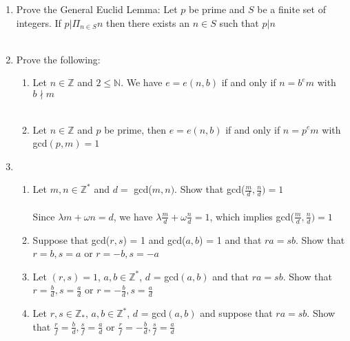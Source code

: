 \documentclass[11pt]{article}
\begin{document}
\begin{enumerate}
\begin{enumerate}
\end{enumerate}

\newpage %
\item Prove the General Euclid Lemma: Let $p$ be prime and $S$ be a finite set of integers.  If $p|\Pi_{n \in S}n$ then there exists an $n \in S$ such that $p | n$
\\
\\


\newpage %
\item Prove the following:
\begin{enumerate}
\item Let $n \in \mathbb{Z}$ and $2 \leq \mathbb{N}$.  We have $e = e(n,b)$ if and only if $n = b^em$ with $b \nmid m$\\
\\
\item Let $n \in \mathbb{Z}$ and $p$ be prime, then $e = e(n,b)$ if and only if $n = p^em$ with gcd$(p,m) = 1$
\end{enumerate}


\newpage %
\item 
\begin{enumerate}
\item Let $m,n \in \mathbb{Z}^*$ and $d = $ gcd($m,n)$.  Show that gcd($\tfrac{m}{d} , \tfrac{n}{d}) = 1$
\\\\
Since $\lambda m + \omega n = d$, we have $\lambda \tfrac{m}{d} + \omega \tfrac{n}{d} = 1$, which implies gcd($\tfrac{m}{d} , \tfrac{n}{d}) = 1$
\\
\item Suppose that gcd($r,s$) = 1 and gcd($a,b$) = 1 and that $ra = sb$.  Show that $r=b, s = a$ or $r = -b, s = -a$
\\
\item Let $(r,s) = 1$, $a,b \in \mathbb{Z}^*$, $d$ = gcd$(a,b)$ and that $ra = sb$.  Show that $r = \tfrac{b}{d}, s = \tfrac{a}{d}$ or $r = -\tfrac{b}{d}, s=\tfrac{a}{d}$
\\
\item Let $r,s \in \mathbb{Z}_*$, $a,b \in \mathbb{Z}^*$, $d$ = gcd$(a,b)$ and suppose that $ra = sb$.  Show that $\tfrac{r}{f} = \tfrac{b}{d}, \tfrac{s}{f} = \tfrac{a}{d}$ or $\tfrac{r}{f} = -\tfrac{b}{d}, \tfrac{s}{f}=\tfrac{a}{d}$
\end{enumerate}



\end{enumerate}
\end{document}
